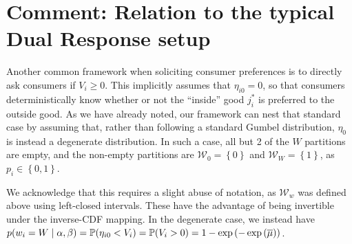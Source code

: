 \documentclass{article}
\begin{document}
\section*{Comment: Relation to the typical Dual Response setup}

Another common framework when soliciting consumer preferences is to directly ask consumers if $V_i \ge 0$. This implicitly assumes that $\eta_{i0} = 0$, so that consumers deterministically know whether or not the ``inside'' good $j^*_i$ is preferred to the outside good. As we have already noted, our framework can nest that standard case by assuming that, rather than following a standard Gumbel distribution, $\eta_0$ is instead a degenerate distribution. In such a case, all but 2 of the $W$ partitions are empty, and the non-empty partitions are $\mathcal{W}_0 = \left\lbrace 0 \right\rbrace$ and $\mathcal{W}_W = \left\lbrace 1\right\rbrace$, as $p_i \in \left\lbrace 0, 1\right\rbrace$.

We acknowledge that this requires a slight abuse of notation, as $\mathcal{W}_w$ was defined above using left-closed intervals. These have the advantage of being invertible under the inverse-CDF mapping. In the degenerate case, we instead have $p\mleft(w_i = W\mid\alpha,\beta\mright) = \mathbb{P}\mleft(\eta_{i0} < V_i\mright) = \mathbb{P}\mleft(V_i > 0\mright) = 1 - \exp\left(-\exp\left(\overline{\mu}\right)\right)$.


\clearpage
\printbibliography
\end{document}
